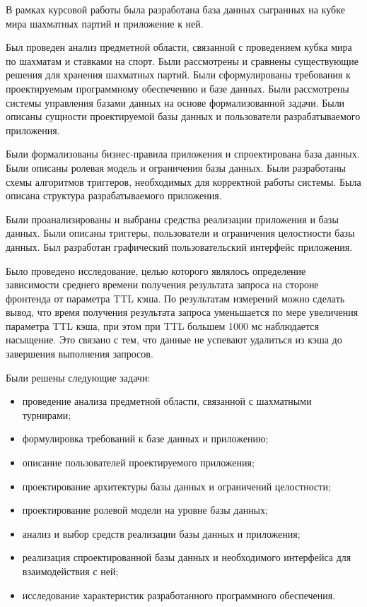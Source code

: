 
В рамках курсовой работы была разработана база данных сыгранных на кубке мира шахматных партий и приложение к ней.

Был проведен анализ предметной области, связанной с проведением кубка мира по шахматам и ставками на спорт. Были рассмотрены и сравнены существующие решения для хранения шахматных партий. Были сформулированы требования к проектируемым программному обеспечению и базе данных. Были рассмотрены системы управления базами данных на основе формализованной задачи. Были описаны сущности проектируемой базы данных и пользователи разрабатываемого приложения.

Были формализованы бизнес-правила приложения и спроектирована база данных. Были описаны ролевая модель и ограничения базы данных. Были разработаны схемы алгоритмов триггеров, необходимых для корректной работы системы. Была описана структура разрабатываемого приложения.

Были проанализированы и выбраны средства реализации приложения и базы данных. Были описаны триггеры, пользователи и ограничения целостности базы данных. Был разработан графический пользовательский интерфейс приложения.

Было проведено исследование, целью которого являлось определение зависимости среднего времени получения результата запроса на стороне фронтенда от параметра TTL кэша. По результатам измерений можно сделать вывод, что время получения результата запроса уменьшается по мере увеличения параметра TTL кэша, при этом при TTL большем 1000 мс наблюдается насыщение.
Это связано с тем, что данные не успевают удалиться из кэша до завершения выполнения запросов.

Были решены следующие задачи:
\begin{itemize}
	\item проведение анализа предметной области, связанной с шахматными турнирами;
	\item формулировка требований к базе данных и приложению;
	\item описание пользователей проектируемого приложения;
	\item проектирование архитектуры базы данных и ограничений целостности;
	\item проектирование ролевой модели на уровне базы данных;
	\item анализ и выбор средств реализации базы данных и приложения;
	\item реализация спроектированной базы данных и необходимого интерфейса для взаимодействия с ней;
	\item исследование характеристик разработанного программного обеспечения.
\end{itemize}
